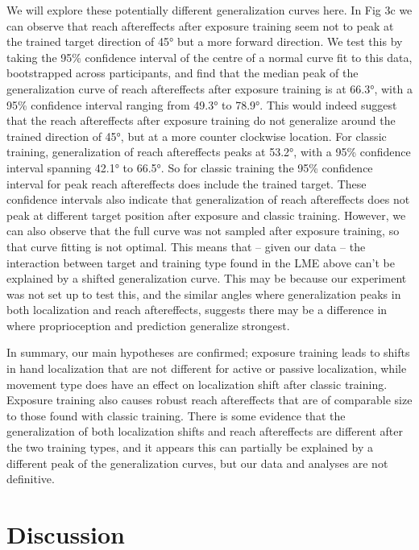 \documentclass[10pt,letterpaper]{article}
\begin{document}
We will explore these potentially different generalization curves here.
In Fig 3c we can observe that reach aftereffects after exposure training
seem not to peak at the trained target direction of 45° but a more
forward direction. We test this by taking the 95\% confidence interval
of the centre of a normal curve fit to this data, bootstrapped across
participants, and find that the median peak of the generalization curve
of reach aftereffects after exposure training is at 66.3°, with a 95\%
confidence interval ranging from 49.3° to 78.9°. This would indeed
suggest that the reach aftereffects after exposure training do not
generalize around the trained direction of 45°, but at a more counter
clockwise location. For classic training, generalization of reach
aftereffects peaks at 53.2°, with a 95\% confidence interval spanning
42.1° to 66.5°. So for classic training the 95\% confidence interval for
peak reach aftereffects does include the trained target. These
confidence intervals also indicate that generalization of reach
aftereffects does not peak at different target position after exposure
and classic training. However, we can also observe that the full curve
was not sampled after exposure training, so that curve fitting is not
optimal. This means that -- given our data -- the interaction between
target and training type found in the LME above can't be explained by a
shifted generalization curve. This may be because our experiment was not
set up to test this, and the similar angles where generalization peaks
in both localization and reach aftereffects, suggests there may be a
difference in where proprioception and prediction generalize strongest.

In summary, our main hypotheses are confirmed; exposure training leads
to shifts in hand localization that are not different for active or
passive localization, while movement type does have an effect on
localization shift after classic training. Exposure training also causes
robust reach aftereffects that are of comparable size to those found
with classic training. There is some evidence that the generalization of
both localization shifts and reach aftereffects are different after the
two training types, and it appears this can partially be explained by a
different peak of the generalization curves, but our data and analyses
are not definitive.

\section{Discussion}\label{discussion}
\end{document}
